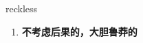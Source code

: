 
\begin{frame}
{\huge reckless}
\begin{center}
\begin{enumerate}\Large
  \item \textbf{不考虑后果的，大胆鲁莽的}
\end{enumerate}
\end{center}
\end{frame}
